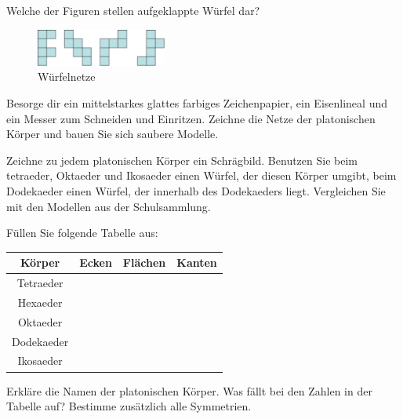 \documentclass[%
11pt,%
twoside,%
titlepage,%
german,%
headsepline%
]{scrartcl}
\newcommand{\spaltenheight}{\rule{0mm}{3ex}}
\newcommand{\spaltensep}{\\[1ex]}
\begin{document}
\begin{ueb}
Welche der Figuren stellen aufgeklappte W\"urfel dar?
\begin{figure}[h!]
\begin{center}
\includegraphics[width=0.382\textwidth]{pictures/wuerfelnetz}
\end{center}
\caption{W\"urfelnetze}
\end{figure}
\end{ueb}

\begin{ueb}
Besorge dir ein mittelstarkes glattes farbiges Zeichenpapier, ein Eisenlineal und ein Messer zum Schneiden und Einritzen. Zeichne die Netze der platonischen K\"orper und bauen Sie sich saubere Modelle.
\end{ueb}

\begin{ueb}
Zeichne zu jedem platonischen K\"orper ein Schr\"agbild. Benutzen Sie beim tetraeder, Oktaeder und Ikosaeder einen W\"urfel, der diesen K\"orper umgibt, beim Dodekaeder einen W\"urfel, der innerhalb des Dodekaeders liegt. Vergleichen Sie mit den Modellen aus der Schulsammlung.
\end{ueb}

\begin{ueb}
F\"ullen Sie folgende Tabelle aus:
\begin{center}
\begin{tabular}{|c|c|c|c|}\hline
\spaltenheight\textbf{K\"orper} & \textbf{Ecken} & \textbf{Fl\"achen} & \textbf{Kanten}\spaltensep \hline
\spaltenheight Tetraeder & & & \spaltensep \hline
\spaltenheight Hexaeder & & & \spaltensep \hline
\spaltenheight Oktaeder & & & \spaltensep \hline
\spaltenheight Dodekaeder & & & \spaltensep \hline
\spaltenheight Ikosaeder & & & \spaltensep \hline
\end{tabular}
\end{center}
Erkl\"are die Namen der platonischen K\"orper. Was f\"allt bei den Zahlen in der Tabelle auf? Bestimme zus\"atzlich alle Symmetrien.
\end{ueb}
\end{document}
